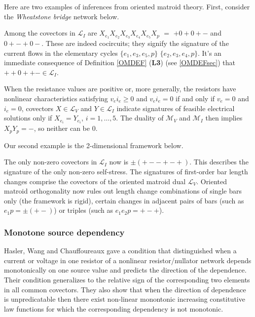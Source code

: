\documentclass{amsproc-sunycstr}
\theoremstyle{plain}
\theoremstyle{definition}
\theoremstyle{remark}
\newcommand{\extra}[1]{{{#1}}}
\begin{document}
Here are two examples of inferences from oriented matroid theory.  First, consider
the \textit{Wheatstone bridge} network below.  
\begin{center}

\end{center}
Among the covectors in
$\mathcal{L}_I$ are $X_{e_1}X_{e_2}X_{e_3}X_{e_4}X_{e_5}X_p$ $=$
$+0+0+-$ and $0+-+0-$.  These are indeed cocircuits; they signify the
signature of the current flows in the elementary cycles $\{e_1,e_3,e_5,p\}$ 
$\{e_2,e_3,e_4,p\}$.  It's an immediate consequence of Definition \ref{OMDEF}
(\textbf{L3}) (see \ref{OMDEFsec}) that 
$++0++- \in \mathcal{L}_I$.

When the resistance values are positive or, more generally, the resistors
have nonlinear characteristics satisfying $v_ei_e \geq 0$ and 
$v_ei_e = 0$ if and only if $v_e=0$ and $i_e=0$, covectors 
$X\in\mathcal{L}_V$ and $Y\in\mathcal{L}_I$ indicate signatures of 
feasible electrical solutions only if $X_{e_i}=Y_{e_i}$, $i=1,\ldots,5$.
The duality of $\mathcal{M}_V$ and $\mathcal{M}_I$ then implies
$X_pY_p=-$, so neither can be $0$.  



Our second example is the 2-dimensional framework below.
\begin{center}

\end{center}
The only non-zero covectors in $\mathcal{L}_I$ now is $\pm(+--+-+)$.
This describes the signature of the only non-zero self-stress.  
The signatures of first-order bar length changes comprise the
covectors of the oriented matroid dual $\mathcal{L}_V$.  Oriented
matroid orthogonality now rules out length change combinations 
of single bars only (the framework is rigid), certain changes in
adjacent pairs of bars (such as $e_1p=\pm(+-)$) or triples (such
as $e_1e_2p=+-+$).


\extra{
\subsubsection{Monotone source dependency}
Hasler, Wang and Chauffoureaux 
\cite{ChauffHaslerMonoDep,HaslerWangMonoDep} gave a condition that distinguished
when a current or voltage in one resistor of a nonlinear resistor/nullator
network depends monotonically on one source value and predicts the 
direction of the dependence.  Their condition generalizes to 
the relative sign of the corresponding 
two elements in all common covectors.  They also show that when the direction
of dependence is unpredicatable then there exist non-linear monontonic
increasing constitutive law functions for which the corresponding dependency is 
not monotonic.
}
\end{document}

